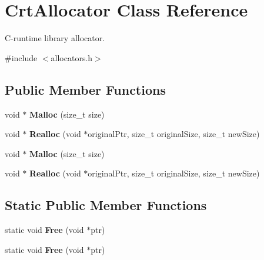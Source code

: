 \hypertarget{classCrtAllocator}{}\section{Crt\+Allocator Class Reference}
\label{classCrtAllocator}


C-\/runtime library allocator.  




{\ttfamily \#include $<$allocators.\+h$>$}

\subsection*{Public Member Functions}
\begin{DoxyCompactItemize}
\item 
\mbox{\label{classCrtAllocator_acd720631f8c094041afa6c7951f0d935}} 
void $\ast$ {\bfseries Malloc} (size\+\_\+t size)
\item 
\mbox{\label{classCrtAllocator_a646bb6f68afe773a62a22f7f14f83e97}} 
void $\ast$ {\bfseries Realloc} (void $\ast$original\+Ptr, size\+\_\+t original\+Size, size\+\_\+t new\+Size)
\item 
\mbox{\label{classCrtAllocator_acd720631f8c094041afa6c7951f0d935}} 
void $\ast$ {\bfseries Malloc} (size\+\_\+t size)
\item 
\mbox{\label{classCrtAllocator_a646bb6f68afe773a62a22f7f14f83e97}} 
void $\ast$ {\bfseries Realloc} (void $\ast$original\+Ptr, size\+\_\+t original\+Size, size\+\_\+t new\+Size)
\end{DoxyCompactItemize}
\subsection*{Static Public Member Functions}
\begin{DoxyCompactItemize}
\item 
\mbox{\label{classCrtAllocator_a5043907058d906dcb1291e9491560373}} 
static void {\bfseries Free} (void $\ast$ptr)
\item 
\mbox{\label{classCrtAllocator_a5043907058d906dcb1291e9491560373}} 
static void {\bfseries Free} (void $\ast$ptr)
\end{DoxyCompactItemize}
